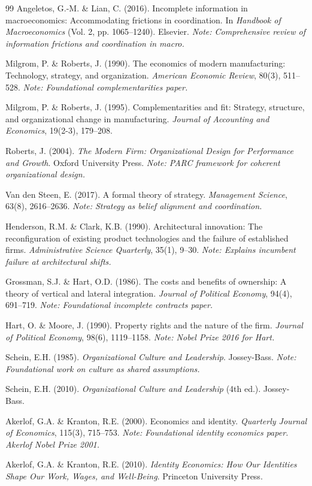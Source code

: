 \begin{thebibliography}{99}
 Angeletos, G.-M. \& Lian, C. (2016). Incomplete information in macroeconomics: Accommodating frictions in coordination. In \textit{Handbook of Macroeconomics} (Vol. 2, pp. 1065--1240). Elsevier. \textit{Note: Comprehensive review of information frictions and coordination in macro.}

 Milgrom, P. \& Roberts, J. (1990). The economics of modern manufacturing: Technology, strategy, and organization. \textit{American Economic Review}, 80(3), 511--528. \textit{Note: Foundational complementarities paper.}

 Milgrom, P. \& Roberts, J. (1995). Complementarities and fit: Strategy, structure, and organizational change in manufacturing. \textit{Journal of Accounting and Economics}, 19(2-3), 179--208.

 Roberts, J. (2004). \textit{The Modern Firm: Organizational Design for Performance and Growth}. Oxford University Press. \textit{Note: PARC framework for coherent organizational design.}

 Van den Steen, E. (2017). A formal theory of strategy. \textit{Management Science}, 63(8), 2616--2636. \textit{Note: Strategy as belief alignment and coordination.}

 Henderson, R.M. \& Clark, K.B. (1990). Architectural innovation: The reconfiguration of existing product technologies and the failure of established firms. \textit{Administrative Science Quarterly}, 35(1), 9--30. \textit{Note: Explains incumbent failure at architectural shifts.}

 Grossman, S.J. \& Hart, O.D. (1986). The costs and benefits of ownership: A theory of vertical and lateral integration. \textit{Journal of Political Economy}, 94(4), 691--719. \textit{Note: Foundational incomplete contracts paper.}

 Hart, O. \& Moore, J. (1990). Property rights and the nature of the firm. \textit{Journal of Political Economy}, 98(6), 1119--1158. \textit{Note: Nobel Prize 2016 for Hart.}

 Schein, E.H. (1985). \textit{Organizational Culture and Leadership}. Jossey-Bass. \textit{Note: Foundational work on culture as shared assumptions.}

 Schein, E.H. (2010). \textit{Organizational Culture and Leadership} (4th ed.). Jossey-Bass.

 Akerlof, G.A. \& Kranton, R.E. (2000). Economics and identity. \textit{Quarterly Journal of Economics}, 115(3), 715--753. \textit{Note: Foundational identity economics paper. Akerlof Nobel Prize 2001.}

 Akerlof, G.A. \& Kranton, R.E. (2010). \textit{Identity Economics: How Our Identities Shape Our Work, Wages, and Well-Being}. Princeton University Press.

\end{thebibliography}


